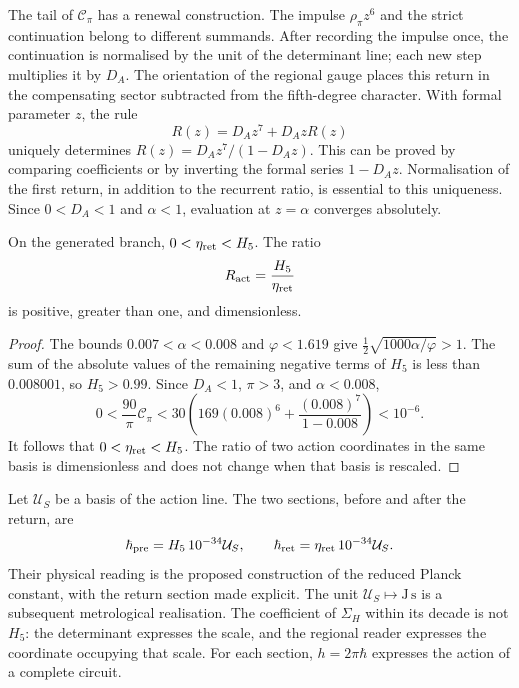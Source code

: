 The tail of \(\mathcal C_\pi\) has a renewal construction.
The impulse \(\rho_\pi z^6\) and the strict continuation belong
to different summands. After recording the impulse once,
the continuation is normalised by the unit of the determinant line;
each new step multiplies it by \(D_A\). The orientation of the
regional gauge places this return in the compensating sector
subtracted from the fifth-degree character.
With formal parameter \(z\), the rule
\begin{equation}
 R(z)=D_Az^7+D_AzR(z)
 \label{vi:dep:renovacion}
\end{equation}
uniquely determines
\(R(z)=D_Az^7/(1-D_Az)\). This can be proved by comparing
coefficients or by inverting the formal series \(1-D_Az\).
Normalisation of the first return, in addition to the recurrent ratio,
is essential to this uniqueness. Since \(0<D_A<1\) and \(\alpha<1\),
evaluation at \(z=\alpha\) converges absolutely.

\begin{proposition}
\label{vi:dep:positividad-accion}
On the generated branch, \(0<\eta_{\rm ret}<H_5\). The ratio
\begin{equation}
 R_{\rm act}=\frac{H_5}{\eta_{\rm ret}}
 \label{vi:dep:Ract}
\end{equation}
is positive, greater than one, and dimensionless.
\end{proposition}
\begin{proof}
The bounds \(0.007<\alpha<0.008\) and \(\varphi<1.619\) give
\(\tfrac12\sqrt{1000\alpha/\varphi}>1\). The sum of the absolute
values of the remaining negative terms of \(H_5\) is less than
\(0.008001\), so \(H_5>0.99\).
Since \(D_A<1\), \(\pi>3\), and \(\alpha<0.008\),
\[
 0<\frac{90}{\pi}\mathcal C_\pi
 <30\left(169(0.008)^6+
                  \frac{(0.008)^7}{1-0.008}\right)<10^{-6}.
\]
It follows that \(0<\eta_{\rm ret}<H_5\). The ratio of two action
coordinates in the same basis is dimensionless and does not change when
that basis is rescaled.
\end{proof}

Let \(\mathcal U_S\) be a basis of the action line. The two
sections, before and after the return, are
\begin{equation}
 \hbar_{\rm pre}=H_5\,10^{-34}\mathcal U_S,
 \qquad
 \hbar_{\rm ret}=\eta_{\rm ret}\,10^{-34}\mathcal U_S.
 \label{vi:dep:hbar}
\end{equation}
Their physical reading is the proposed construction of the reduced Planck
constant, with the return section made explicit. The unit
\(\mathcal U_S\mapsto\mathrm{J\,s}\) is a subsequent metrological
realisation. The coefficient of \(\Sigma_H\) within its decade is not
\(H_5\): the determinant expresses the scale, and the regional reader
expresses the coordinate occupying that scale. For each section,
\(h=2\pi\hbar\) expresses the action of a complete circuit.

